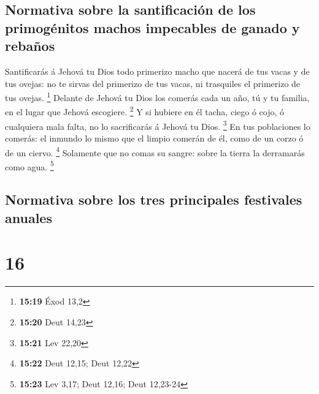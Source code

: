 \hypertarget{normativa-sobre-la-santificaciuxf3n-de-los-primoguxe9nitos-machos-impecables-de-ganado-y-rebauxf1os}{%
\subsection{Normativa sobre la santificación de los primogénitos machos
impecables de ganado y
rebaños}\label{normativa-sobre-la-santificaciuxf3n-de-los-primoguxe9nitos-machos-impecables-de-ganado-y-rebauxf1os}}

 Santificarás á Jehová tu Dios todo primerizo macho que
nacerá de tus vacas y de tus ovejas: no te sirvas del primerizo de tus
vacas, ni trasquiles el primerizo de tus ovejas. \footnote{\textbf{15:19}
  Éxod 13,2}  Delante de Jehová tu Dios los comerás cada
un año, tú y tu familia, en el lugar que Jehová escogiere. \footnote{\textbf{15:20}
  Deut 14,23}  Y si hubiere en él tacha, ciego ó cojo, ó
cualquiera mala falta, no lo sacrificarás á Jehová tu Dios. \footnote{\textbf{15:21}
  Lev 22,20}  En tus poblaciones lo comerás: el inmundo
lo mismo que el limpio comerán de él, como de un corzo ó de un ciervo.
\footnote{\textbf{15:22} Deut 12,15; Deut 12,22} 
Solamente que no comas su sangre: sobre la tierra la derramarás como
agua. \footnote{\textbf{15:23} Lev 3,17; Deut 12,16; Deut 12,23-24}

\hypertarget{normativa-sobre-los-tres-principales-festivales-anuales}{%
\subsection{Normativa sobre los tres principales festivales
anuales}\label{normativa-sobre-los-tres-principales-festivales-anuales}}

\hypertarget{section-15}{%
\section{16}\label{section-15}}

